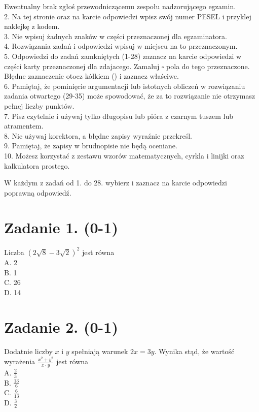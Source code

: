 \documentclass[10pt]{article}
\begin{document}
Ewentualny brak zgłoś przewodniczącemu zespołu nadzorującego egzamin.\\
2. Na tej stronie oraz na karcie odpowiedzi wpisz swój numer PESEL i przyklej naklejkę z kodem.\\
3. Nie wpisuj żadnych znaków w części przeznaczonej dla egzaminatora.\\
4. Rozwiązania zadań i odpowiedzi wpisuj w miejscu na to przeznaczonym.\\
5. Odpowiedzi do zadań zamkniętych (1-28) zaznacz na karcie odpowiedzi w części karty przeznaczonej dla zdajacego. Zamaluj \(\square\) pola do tego przeznaczone. Błędne zaznaczenie otocz kółkiem () i zaznacz właściwe.\\
6. Pamiętaj, że pominięcie argumentacji lub istotnych obliczeń w rozwiązaniu zadania otwartego (29-35) może spowodować, że za to rozwiązanie nie otrzymasz pełnej liczby punktów.\\
7. Pisz czytelnie i używaj tylko długopisu lub pióra z czarnym tuszem lub atramentem.\\
8. Nie używaj korektora, a błędne zapisy wyraźnie przekreśl.\\
9. Pamiętaj, że zapisy w brudnopisie nie będą oceniane.\\
10. Możesz korzystać z zestawu wzorów matematycznych, cyrkla i linijki oraz kalkulatora prostego.

W każdym z zadań od 1. do 28. wybierz i zaznacz na karcie odpowiedzi poprawną odpowiedź.

\section*{Zadanie 1. (0-1)}
Liczba \((2 \sqrt{8}-3 \sqrt{2})^{2}\) jest równa\\
A. 2\\
B. 1\\
C. 26\\
D. 14

\section*{Zadanie 2. (0-1)}
Dodatnie liczby \(x\) i \(y\) spełniają warunek \(2 x=3 y\). Wynika stąd, że wartość wyrażenia \(\frac{x^{2}+y^{2}}{x \cdot y}\) jest równa\\
A. \(\frac{2}{3}\)\\
B. \(\frac{13}{6}\)\\
C. \(\frac{6}{13}\)\\
D. \(\frac{3}{2}\)
\end{document}
